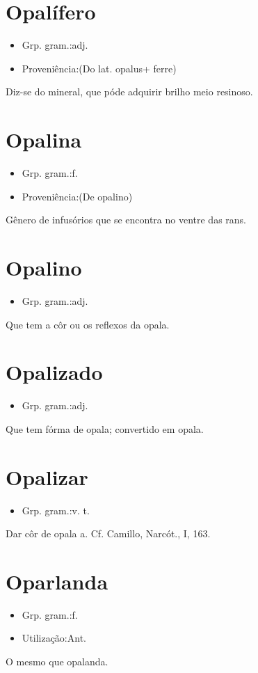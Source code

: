 \section{Opalífero}
\begin{itemize}
\item {Grp. gram.:adj.}
\end{itemize}
\begin{itemize}
\item {Proveniência:(Do lat. \textunderscore opalus\textunderscore  + \textunderscore ferre\textunderscore )}
\end{itemize}
Diz-se do mineral, que póde adquirir brilho meio resinoso.
\section{Opalina}
\begin{itemize}
\item {Grp. gram.:f.}
\end{itemize}
\begin{itemize}
\item {Proveniência:(De \textunderscore opalino\textunderscore )}
\end{itemize}
Gênero de infusórios que se encontra no ventre das rans.
\section{Opalino}
\begin{itemize}
\item {Grp. gram.:adj.}
\end{itemize}
Que tem a côr ou os reflexos da opala.
\section{Opalizado}
\begin{itemize}
\item {Grp. gram.:adj.}
\end{itemize}
Que tem fórma de opala; convertido em opala.
\section{Opalizar}
\begin{itemize}
\item {Grp. gram.:v. t.}
\end{itemize}
Dar côr de opala a. Cf. Camillo, \textunderscore Narcót.\textunderscore , I, 163.
\section{Oparlanda}
\begin{itemize}
\item {Grp. gram.:f.}
\end{itemize}
\begin{itemize}
\item {Utilização:Ant.}
\end{itemize}
O mesmo que \textunderscore opalanda\textunderscore .
